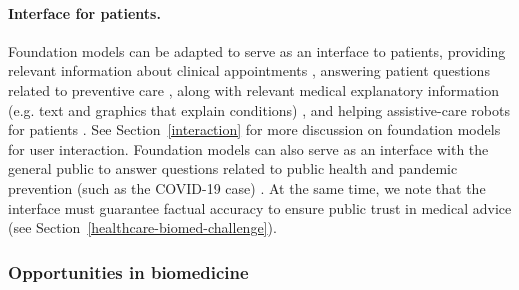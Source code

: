 \paragraph{Interface for patients.} Foundation models can be adapted to serve as an interface to patients, providing relevant information about clinical appointments \citep{bates2019health}, answering patient questions related to preventive care \citep{demner2020consumer}, along with relevant medical explanatory information (e.g. text and graphics that explain conditions) \citep{chaix2019chatbots}, and helping assistive-care robots for patients \citep{jeong2015designing,abdi2018scoping}. See Section~\ref{interaction} for more discussion on foundation models for user interaction. Foundation models can also serve as an interface with the general public to answer questions related to public health and pandemic prevention (such as the COVID-19 case) \citep{bharti2020medbot,herriman2020asked}. At the same time, we note that the interface must guarantee factual accuracy to ensure public trust in medical advice \citep{kreps2020model} (see Section~\ref{healthcare-biomed-challenge}). 

\subsubsection{Opportunities in biomedicine}
\label{sec:biomed-tasks}

